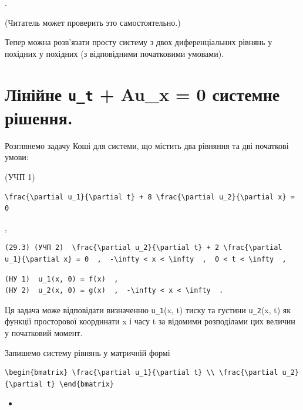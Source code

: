 \documentclass[
  ukrainian,
]{article}
\providecommand{\tightlist}{%
  \setlength{\itemsep}{0pt}\setlength{\parskip}{0pt}}
\begin{document}
.

(Читатель может проверить это самостоятельно.)

Тепер можна розв'язати просту систему з двох диференціальних рівнянь у
похідних у похідних (з відповідними початковими умовами).

\section{\texorpdfstring{Лінійне \texttt{u\_t} + Au\_x = 0 системне
рішення.}{Лінійне u\_t + Au\_x = 0 системне рішення.}}\label{ux43bux456ux43dux456ux439ux43dux435-u_t-au_x-0-ux441ux438ux441ux442ux435ux43cux43dux435-ux440ux456ux448ux435ux43dux43dux44f.}

Розглянемо задачу Коші для системи, що містить два рівняння та дві
початкові умови:

(УЧП 1)

\begin{verbatim}
\frac{\partial u_1}{\partial t} + 8 \frac{\partial u_2}{\partial x} = 0
\end{verbatim}

,

\begin{verbatim}
(29.3) (УЧП 2)  \frac{\partial u_2}{\partial t} + 2 \frac{\partial u_1}{\partial x} = 0  ,  -\infty < x < \infty  ,  0 < t < \infty  ,
\end{verbatim}

\begin{verbatim}
(HУ 1)  u_1(x, 0) = f(x)  ,
(HУ 2)  u_2(x, 0) = g(x)  ,  -\infty < x < \infty  .
\end{verbatim}

Ця задача може відповідати визначенню \texttt{u\_1}(x, t) тиску та
густини \texttt{u\_2}(x, t) як функції просторової координати x і часу t
за відомими розподілами цих величин у початковий момент.

Запишемо систему рівнянь у матричній формі

\begin{verbatim}
\begin{bmatrix} \frac{\partial u_1}{\partial t} \\ \frac{\partial u_2}{\partial t} \end{bmatrix}
\end{verbatim}

\begin{itemize}
\tightlist
\item
\end{itemize}
\end{document}
